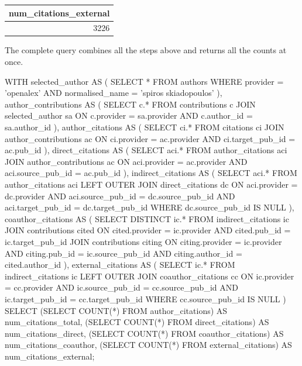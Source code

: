 \begin{center}
    \begin{tabular}{|r|}
        \hline
        num\_citations\_external \\
        \hline\hline
        3226 \\
        \hline
    \end{tabular}
\end{center}

The complete query combines all the steps above and returns all the counts at once.

\begin{SQLcode}
WITH
selected_author AS (
    SELECT *
    FROM authors
    WHERE provider = 'openalex'
        AND normalised_name = 'spiros skiadopoulos'
),
author_contributions AS (
    SELECT c.*
    FROM contributions c
        JOIN selected_author sa
            ON c.provider = sa.provider
                AND c.author_id = sa.author_id
),
author_citations AS (
    SELECT ci.*
    FROM citations ci
        JOIN author_contributions ac
            ON ci.provider = ac.provider
                AND ci.target_pub_id = ac.pub_id
),
direct_citations AS (
    SELECT aci.*
    FROM author_citations aci
        JOIN author_contributions ac
            ON aci.provider = ac.provider
                AND aci.source_pub_id = ac.pub_id
),
indirect_citations AS (
    SELECT aci.*
    FROM author_citations aci
        LEFT OUTER JOIN direct_citations dc
            ON aci.provider = dc.provider
                AND aci.source_pub_id = dc.source_pub_id
                AND aci.target_pub_id = dc.target_pub_id
    WHERE dc.source_pub_id IS NULL
),
coauthor_citations AS (
    SELECT DISTINCT ic.*
    FROM indirect_citations ic
        JOIN contributions cited
            ON cited.provider = ic.provider
                AND cited.pub_id = ic.target_pub_id
        JOIN contributions citing
            ON citing.provider = ic.provider
                AND citing.pub_id = ic.source_pub_id
                AND citing.author_id = cited.author_id
),
external_citations AS (
    SELECT ic.*
    FROM indirect_citations ic
        LEFT OUTER JOIN coauthor_citations cc
            ON ic.provider = cc.provider
                AND ic.source_pub_id = cc.source_pub_id
                AND ic.target_pub_id = cc.target_pub_id
    WHERE cc.source_pub_id IS NULL
)
SELECT
    (SELECT COUNT(*) FROM author_citations)
        AS num_citations_total,
    (SELECT COUNT(*) FROM direct_citations)
        AS num_citations_direct,
    (SELECT COUNT(*) FROM coauthor_citations)
        AS num_citations_coauthor,
    (SELECT COUNT(*) FROM external_citations)
        AS num_citations_external;
\end{SQLcode}

